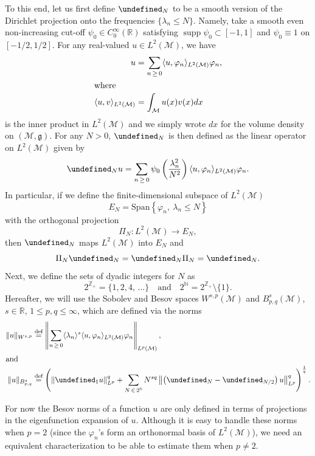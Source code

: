 \documentclass[AHL,Unicode,longabstracts,published]{cedram}
\newcommand{\Z}{\mathbb{Z}}
\newcommand{\R}{\mathbb{R}}
\newcommand{\N}{\mathbb{N}}
\DeclareMathOperator*{\supp}{supp}
\newcommand{\deff}{\overset{\textup{def}}{=}}
\let\P= \undefined
\newcommand{\P}{\mathbf{P}}
\newcommand{\M}{\mathcal{M}}
\newcommand{\Span}{\mathrm{Span}}
\newcommand{\g}{\mathfrak{g}}
\newcommand{\jb}[1] {\langle #1 \rangle}
\begin{document}
To this end, let us first define $\P_N$ to be a smooth version of the Dirichlet projection onto the frequencies $\{\lambda_n\leq N\}$. Namely, take a smooth even non-increasing cut-off $\psi_0\in C_0^{\infty}(\R)$ satisfying $\supp \psi_0 \subset [-1,1]$ and $\psi_0\equiv 1$ on $[-1/2,1/2]$. For any real-valued $u\in L^2(\M)$, we have
\begin{align*}
u &= \sum_{n\,\geq\,0}\langle u,\varphi_n\rangle_{L^2(\M)}\varphi_n,
\\
\intertext{where}
\langle u,v\rangle_{L^2(\M)} &= \int_{\M}u(x)v(x)dx
\end{align*}
is the inner product in $L^2(\M)$ and we simply wrote $dx$ for the volume density on $(\M,\g)$. For any $N>0$, $\P_N$ is then defined as the linear operator on $L^2(\M)$ given by
\begin{equation}\label{def-P}
\P_Nu = \sum_{n\,\geq\,0} \psi_0\left(\frac{\lambda_n^2}{N^2}\right)\langle u,\varphi_n\rangle_{L^2(\M)}\varphi_n.
\end{equation}
In particular, if we define the finite-dimensional subspace of $L^2(\M)$
\begin{equation*}
E_N = \Span\left\{\varphi_n,~\lambda_n \leq N\right\}
\end{equation*}
with the orthogonal projection
\begin{equation*}
\Pi_N: L^2(\M)\rightarrow E_N,
\end{equation*}
then $\P_N$ maps $L^2(\M)$ into $E_N$ and
\begin{equation}\label{prop-PiN}
\Pi_N\P_N = \P_N\Pi_N = \P_N.
\end{equation}
Next, we define the sets of dyadic integers for $N$ as
\begin{equation*}
2^{\Z_+} = \{1,2,4,\,\dots\} \quad\text{and}\quad 2^{\N}=2^{\Z_+}\setminus\{1\}.
\end{equation*}
Hereafter, we will use the Sobolev and Besov spaces $W^{s,p}(\M)$ and $B^{s}_{p,q}(\M)$, $s\in\R$, $1\leq p,q\leq \infty$, which are defined via the norms
\begin{align*}
\|u\|_{W^{s,p}}
&\deff \left\|\sum_{n\,\geq\,0} \jb{\lambda_n}^s\langle u,\varphi_n\rangle_{L^2(\M)}\varphi_n\right\|_{L^p(\M)},
\\
\intertext{and}
\|u\|_{B^s_{p,q}}
&\deff \left(\left\|\P_1 u\right\|_{L^{p}}^q+\sum_{N\,\in\,2^{\N}}N^{sq}\left\|\left(\P_N-\P_{N/2}\right) u\right\|_{L^{p} }^q\right)^{\frac1q}.
\end{align*}

For now the Besov norms of a function $u$ are only defined in terms of projections in the eigenfunction expansion of $u$. Although it is easy to handle these norms when $p=2$ (since the $\varphi_n$'s form an orthonormal basis of $L^2(\M)$), we need an equivalent characterization to be able to estimate them when $p\neq 2$.
\end{document}
